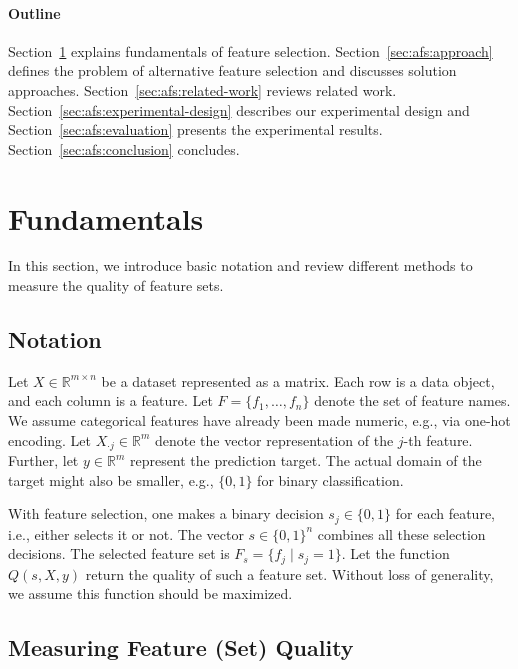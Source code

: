 \documentclass{article}
\theoremstyle{definition}
\begin{document}
\paragraph{Outline}

Section~\ref{sec:afs:fundamentals} explains fundamentals of feature selection.
Section~\ref{sec:afs:approach} defines the problem of alternative feature selection and discusses solution approaches.
Section~\ref{sec:afs:related-work} reviews related work.
Section~\ref{sec:afs:experimental-design} describes our experimental design and Section~\ref{sec:afs:evaluation} presents the experimental results.
Section~\ref{sec:afs:conclusion} concludes.

\section{Fundamentals}
\label{sec:afs:fundamentals}

In this section, we introduce basic notation and review different methods to measure the quality of feature sets.

\subsection{Notation}
\label{sec:afs:fundamentals:notation}

Let $X \in \mathbb{R}^{m \times n}$ be a dataset represented as a matrix.
Each row is a data object, and each column is a feature.
Let $F = \{f_1, \dots, f_n\}$ denote the set of feature names.
We assume categorical features have already been made numeric, e.g., via one-hot encoding.
Let $X_{\cdot{}j} \in \mathbb{R}^m$ denote the vector representation of the $j$-th feature.
Further, let $y \in \mathbb{R}^m$ represent the prediction target.
The actual domain of the target might also be smaller, e.g., $\{0,1\}$ for binary classification.

With feature selection, one makes a binary decision $s_j \in \{0,1\}$ for each feature, i.e., either selects it or not.
The vector $s \in \{0,1\}^n$ combines all these selection decisions.
The selected feature set is $F_s = \{f_j \mid s_j=1\}$.
Let the function $Q(s,X,y)$ return the quality of such a feature set.
Without loss of generality, we assume this function should be maximized.

\subsection{Measuring Feature (Set) Quality}
\label{sec:afs:fundamentals:quality}
\end{document}
